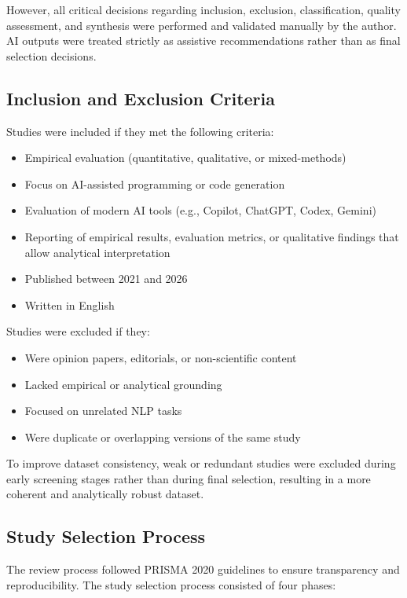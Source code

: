 \documentclass[conference]{IEEEtran}
\begin{document}
However, all critical decisions regarding inclusion, exclusion, classification, quality assessment, and synthesis were performed and validated manually by the author. AI outputs were treated strictly as assistive recommendations rather than as final selection decisions.

\subsection{Inclusion and Exclusion Criteria}

Studies were included if they met the following criteria:
\begin{itemize}
    \item Empirical evaluation (quantitative, qualitative, or mixed-methods)
    \item Focus on AI-assisted programming or code generation
    \item Evaluation of modern AI tools (e.g., Copilot, ChatGPT, Codex, Gemini)
    \item Reporting of empirical results, evaluation metrics, or qualitative findings that allow analytical interpretation
    \item Published between 2021 and 2026
    \item Written in English
\end{itemize}

Studies were excluded if they:
\begin{itemize}
    \item Were opinion papers, editorials, or non-scientific content
    \item Lacked empirical or analytical grounding
    \item Focused on unrelated NLP tasks
    \item Were duplicate or overlapping versions of the same study
\end{itemize}

To improve dataset consistency, weak or redundant studies were excluded during early screening stages rather than during final selection, resulting in a more coherent and analytically robust dataset.

\subsection{Study Selection Process}

The review process followed PRISMA 2020 guidelines \cite{page2021prisma} to ensure transparency and reproducibility. The study selection process consisted of four phases:
\end{document}
